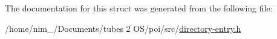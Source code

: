 The documentation for this struct was generated from the following file\-:\begin{DoxyCompactItemize}
\item 
/home/nim\-\_/\-Documents/tubes 2 O\-S/poi/src/\hyperlink{directory-entry_8h}{directory-\/entry.\-h}\end{DoxyCompactItemize}

